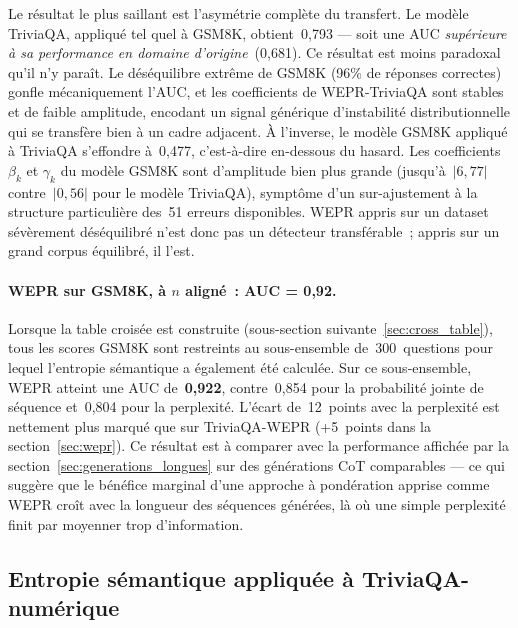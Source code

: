 Le résultat le plus saillant est l'asymétrie complète du transfert. Le
modèle TriviaQA, appliqué tel quel à GSM8K, obtient~0{,}793 — soit une
AUC \emph{supérieure à sa performance en domaine d'origine}~(0{,}681).
Ce résultat est moins paradoxal qu'il n'y paraît. Le déséquilibre
extrême de GSM8K (96\% de réponses correctes) gonfle mécaniquement
l'AUC, et les coefficients de WEPR-TriviaQA sont stables et de faible
amplitude, encodant un signal générique d'instabilité distributionnelle
qui se transfère bien à un cadre adjacent. À l'inverse, le modèle
GSM8K appliqué à TriviaQA s'effondre à~0{,}477, c'est-à-dire en-dessous
du hasard. Les coefficients $\beta_k$ et $\gamma_k$ du modèle GSM8K
sont d'amplitude bien plus grande (jusqu'à~$|6{,}77|$ contre~$|0{,}56|$
pour le modèle TriviaQA), symptôme d'un sur-ajustement à la structure
particulière des~51 erreurs disponibles. WEPR appris sur un
dataset sévèrement déséquilibré n'est donc pas un détecteur transférable~;
appris sur un grand corpus équilibré, il l'est.

\paragraph{WEPR sur GSM8K, à $n$ aligné~: AUC = 0{,}92.}
Lorsque la table croisée est construite (sous-section
suivante~\ref{sec:cross_table}), tous les scores GSM8K sont restreints
au sous-ensemble de~300~questions pour lequel l'entropie sémantique a
également été calculée. Sur ce sous-ensemble, WEPR atteint une AUC
de~\textbf{0{,}922}, contre~0{,}854 pour la probabilité jointe
de séquence et~0{,}804 pour la perplexité. L'écart de~12~points avec la
perplexité est nettement plus marqué que sur TriviaQA-WEPR
(+5~points dans la section~\ref{sec:wepr}). Ce résultat est à comparer
avec la performance affichée par la section~\ref{sec:generations_longues}
sur des générations CoT comparables — ce qui suggère que le bénéfice
marginal
d'une approche à pondération apprise comme WEPR croît avec la longueur
des séquences générées, là où une simple perplexité finit par moyenner
trop d'information.

\subsection{Entropie sémantique appliquée à TriviaQA-numérique}
\label{sec:se_triviaqa}

